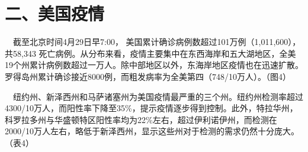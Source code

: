 \documentclass[]{article}
\begin{document}
\vspace{-7mm}

\hypertarget{section-3}{%
\section{\texorpdfstring{\textcolor{glaucous}{\Huge 二、美国疫情}}{}}\label{section-3}}

\vspace{-5mm}

\(\quad\)截至北京时间4月29日早7:00，
美国累计确诊病例数超过101万例（1,011,600），共58,343
死亡病例。从分布来看，疫情主要集中在东西海岸和五大湖地区，全美19个州累计病例数超过一万人。除中部地区以外，东海岸地区疫情也在迅速扩散。罗得岛州累计确诊接近8000例，而粗发病率为全美第四（748/10万人）。（图4）

\(\quad\)纽约州、新泽西州和马萨诸塞州为美国疫情最严重的三个州。纽约州检测率超过4300/10万人，而阳性率下降至35\%，提示疫情逐步得到控制。此外，特拉华州，科罗拉多州与华盛顿特区阳性率均为22\%左右，超过伊利诺伊州，而检测在2000/10万人左右，略低于新泽西州，显示这些州对于检测的需求仍然十分庞大。（表4）
\end{document}
